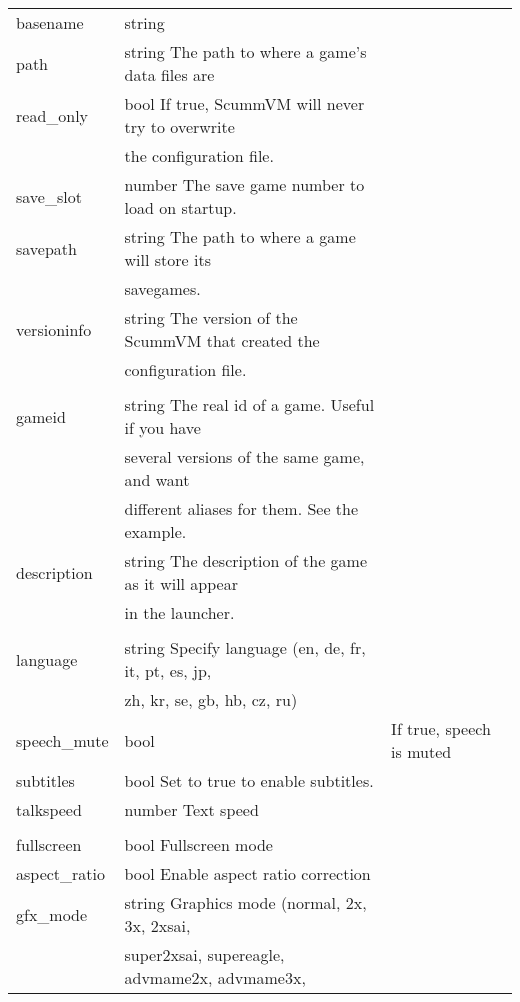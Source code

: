 \begin{tabular}[hf]{lll}
        basename       &string\\
        path           &string   The path to where a game's data files are\\
        read\_only     &bool     If true, ScummVM will never try to overwrite\\
                       &         the configuration file.\\
        save\_slot     &number   The save game number to load on startup.\\
        savepath       &string   The path to where a game will store its\\
                       &         savegames.\\
        versioninfo    &string   The version of the ScummVM that created the\\
                       &         configuration file.\\
\\
        gameid         &string   The real id of a game. Useful if you have\\
                       &         several versions of the same game, and want\\
                       &         different aliases for them. See the example.\\
        description    &string   The description of the game as it will appear\\
                       &         in the launcher.\\
\\
        language       &string   Specify language (en, de, fr, it, pt, es, jp,\\
                       &         zh, kr, se, gb, hb, cz, ru)\\
        speech\_mute    &bool    &If true, speech is muted\\
        subtitles      &bool     Set to true to enable subtitles.\\
        talkspeed      &number   Text speed\\
\\
        fullscreen     &bool     Fullscreen mode\\
        aspect\_ratio  &bool     Enable aspect ratio correction\\
        gfx\_mode      &string   Graphics mode (normal, 2x, 3x, 2xsai,\\
                       &         super2xsai, supereagle, advmame2x, advmame3x,\\

\end{tabular}
